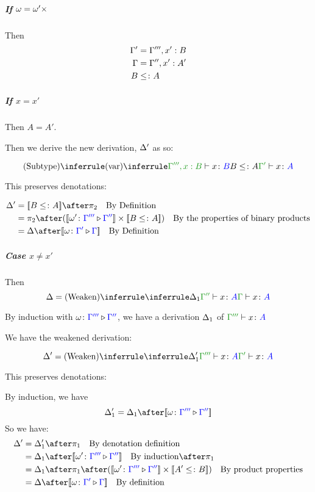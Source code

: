 \documentclass{report}
\begin{document}
    \subparagraph{If $\omega = \omega'\times$} 
    Then 
    \begin{align*}
        \Gamma' & = \Gamma''', x': B\\
        \Gamma &= \Gamma'', x': A'\\
        B & \leq\colon A
    \end{align*}

    \subparagraph{If $x = x'$}

    Then $A = A'$.

    Then we derive the new derivation, $\Delta'$ as so:

    \begin{equation}
        \ntreeruleII{Subtype}{
            \ntreeruleI{var}{}{\typerelation{\G''', x: B}{x}{B}}
            }{
            B \subtype A
        }{
            \typerelation{\G'}{x}{A}
        }
    \end{equation}

    This preserves denotations:

    \begin{align*}
        \D' & = \deno{B\subtype A}\after\pp\qt{By Definition} \\
         & = \pp\after (\deno{\wrel{\w'}{\G'''}{\G''}}\times \deno{B\subtype A}) \qt{By the properties of binary products}\\
         & = \D\after\deno{\wrel{\w}{\G'}{\G}}\qt{By Definition}
    \end{align*}

    \subparagraph{Case $x \neq x'$}
    Then 
    \begin{equation}
        \D = \ntreeruleI{Weaken}{\treeruleI{\D_1}{\typerelation{\G''}{x}{A}}}{\gtyperelation{x}{A}}
    \end{equation}

    By induction with $\omega \colon {\color{blue}\Gamma'''} \triangleright {\color {blue} \Gamma''}$,
     we have a derivation $\Delta_1$ of $\typerelation{\G'''}{x}{A}$

    We have the weakened derivation:

    \begin{equation}
        \D' = \ntreeruleI{Weaken}{\treeruleI{\D_1'}{\typerelation{\G'''}{x}{A}}}{\typerelation{\G'}{x}{A}}
    \end{equation}

    This preserves denotations:

    By induction, we have
    \begin{equation}
        \D_1' = \D_1 \after \deno{\wrel{\w}{\G'''}{\G''}}
    \end{equation}
    So we have:
    \begin{align*}
        \D' &= \D_1' \after \p\qt{By denotation definition}\\
        & = \D_1\after\deno{\wrel{\w'}{\G'''}{\G''}}\qt{By induction}\after\p \\
        & = \D_1\after\p\after(\deno{\wrel{\w'}{\G'''}{\G''}}\times\deno{A' \subtype B})\qt{By product properties}\\
        & = \D\after\deno{\wrel{\w}{\G'}{\G}}\qt{By definition}
    \end{align*}
\end{document}
